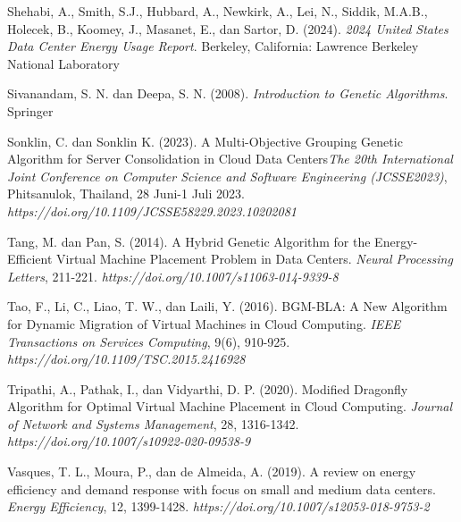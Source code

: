 \begin{thebibliography}{99}
	

	Shehabi, A., Smith, S.J., Hubbard, A., Newkirk, A., Lei, N., Siddik, M.A.B., Holecek, B., Koomey,
	J., Masanet, E., dan Sartor, D. (2024). \textit{2024 United States Data Center Energy Usage Report}. Berkeley, California: Lawrence Berkeley National Laboratory
	
	

	Sivanandam, S. N. dan Deepa, S. N. (2008). \textit{Introduction to Genetic Algorithms}. Springer 
	
	

	Sonklin, C. dan Sonklin K. (2023). A Multi-Objective Grouping Genetic Algorithm for Server Consolidation in Cloud Data Centers\textit{The 20th International Joint Conference on Computer Science and Software Engineering (JCSSE2023)}, Phitsanulok, Thailand, 28 Juni-1 Juli 2023. \textit{https://doi.org/10.1109/JCSSE58229.2023.10202081}
	
	

	Tang, M. dan Pan, S. (2014). A Hybrid Genetic Algorithm for the Energy-Efficient Virtual Machine Placement Problem in Data Centers. \textit{Neural Processing Letters}, 211-221. \textit{https://doi.org/10.1007/s11063-014-9339-8}
	
	

	Tao, F., Li, C., Liao, T. W., dan Laili, Y. (2016). BGM-BLA: A New Algorithm for Dynamic Migration of Virtual Machines in Cloud Computing. \textit{IEEE Transactions on Services Computing}, 9(6), 910-925. \textit{https://doi.org/10.1109/TSC.2015.2416928}

	

	Tripathi, A., Pathak, I., dan Vidyarthi, D. P. (2020). Modified Dragonfly Algorithm for Optimal Virtual Machine Placement in Cloud Computing. \textit{Journal of Network and Systems Management}, 28, 1316-1342. \textit{https://doi.org/10.1007/s10922-020-09538-9}
	
	

	Vasques, T. L., Moura, P., dan de Almeida, A. (2019). A review on energy efficiency and demand response with focus on small and medium data centers. \textit{Energy Efficiency}, 12, 1399-1428. \textit{https://doi.org/10.1007/s12053-018-9753-2}
		

\end{thebibliography}
